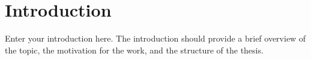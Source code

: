 \chapter{Introduction}\label{chapter:introduction}
Enter your introduction here. The introduction should provide a brief overview of the topic, the motivation for the work, and the structure of the thesis.\cite{bringhurst-2005-elements_typographic_style}